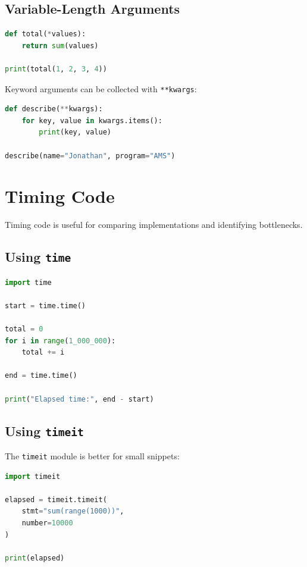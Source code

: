 \documentclass[12pt,oneside]{book}
\numberwithin{equation}{section}
\theoremstyle{definition}
\theoremstyle{plain}
\theoremstyle{remark}
\begin{document}
\subsection{Variable-Length Arguments}

\begin{lstlisting}[language=Python]
def total(*values):
    return sum(values)

print(total(1, 2, 3, 4))
\end{lstlisting}

Keyword arguments can be collected with \texttt{**kwargs}:
\begin{lstlisting}[language=Python]
def describe(**kwargs):
    for key, value in kwargs.items():
        print(key, value)

describe(name="Jonathan", program="AMS")
\end{lstlisting}

\section{Timing Code}

Timing code is useful for comparing implementations and identifying bottlenecks.

\subsection{Using \texttt{time}}

\begin{lstlisting}[language=Python]
import time

start = time.time()

total = 0
for i in range(1_000_000):
    total += i

end = time.time()

print("Elapsed time:", end - start)
\end{lstlisting}

\subsection{Using \texttt{timeit}}

The \texttt{timeit} module is better for small snippets:
\begin{lstlisting}[language=Python]
import timeit

elapsed = timeit.timeit(
    stmt="sum(range(1000))",
    number=10000
)

print(elapsed)
\end{lstlisting}
\end{document}
